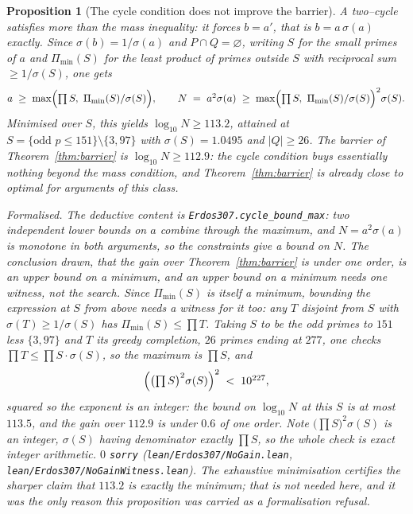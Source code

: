 \documentclass[11pt]{article}
\newtheorem{proposition}[theorem]{Proposition}
\theoremstyle{definition}
\begin{document}
\begin{proposition}[The cycle condition does not improve the barrier]\label{prop:nogain}
A two--cycle satisfies more than the mass inequality: it forces $b=a'$, that is $b=a\,\sigma(a)$
exactly. Since $\sigma(b)=1/\sigma(a)$ and $P\cap Q=\varnothing$, writing $S$ for the small primes of
$a$ and $\Pi_{\min}(S)$ for the least product of primes outside $S$ with reciprocal sum
$\ge1/\sigma(S)$, one gets
\[ a\;\ge\;\max\Bigl(\textstyle\prod S,\ \Pi_{\min}(S)/\sigma(S)\Bigr),\qquad
   N\;=\;a^2\sigma(a)\;\ge\;\max\Bigl(\textstyle\prod S,\ \Pi_{\min}(S)/\sigma(S)\Bigr)^2\sigma(S). \]
Minimised over $S$, this yields $\log_{10}N\ge113.2$, attained at
$S=\{\text{odd }p\le151\}\setminus\{3,97\}$ with $\sigma(S)=1.0495$ and $|Q|\ge26$. The barrier of
Theorem~\ref{thm:barrier} is $\log_{10}N\ge112.9$: \emph{the cycle condition buys essentially nothing
beyond the mass condition}, and Theorem~\ref{thm:barrier} is already close to optimal for arguments
of this class.

\textup{Formalised.} The deductive content is \texttt{Erdos307.cycle\_bound\_max}: two independent
lower bounds on $a$ combine through the maximum, and $N=a^2\sigma(a)$ is monotone in both arguments,
so the constraints give a bound on $N$. The conclusion drawn, that the gain over
Theorem~\ref{thm:barrier} is under one order, is an \emph{upper} bound on a minimum, and an upper
bound on a minimum needs one witness, not the search. Since $\Pi_{\min}(S)$ is itself a minimum,
bounding the expression at $S$ from above needs a witness for it too: any $T$ disjoint from $S$ with
$\sigma(T)\ge1/\sigma(S)$ has $\Pi_{\min}(S)\le\prod T$. Taking $S$ to be the odd primes to $151$
less $\{3,97\}$ and $T$ its greedy completion, $26$ primes ending at $277$, one checks
$\prod T\le\prod S\cdot\sigma(S)$, so the maximum is $\prod S$, and
\[ \Bigl(\bigl(\textstyle\prod S\bigr)^2\sigma(S)\Bigr)^{2}\;<\;10^{227}, \]
squared so the exponent is an integer: the bound on $\log_{10}N$ at this $S$ is at most $113.5$, and
the gain over $112.9$ is under $0.6$ of one order. Note $\bigl(\prod S\bigr)^2\sigma(S)$ is an
integer, $\sigma(S)$ having denominator exactly $\prod S$, so the whole check is exact integer
arithmetic. $0$ \texttt{sorry} \textup{(\texttt{lean/Erdos307/NoGain.lean},
\texttt{lean/Erdos307/NoGainWitness.lean})}. The exhaustive minimisation certifies the sharper claim
that $113.2$ is exactly the minimum; that is not needed here, and it was the only reason this
proposition was carried as a formalisation refusal.
\end{proposition}
\end{document}
